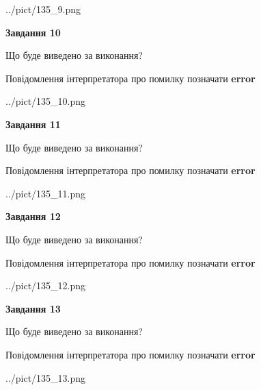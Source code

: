 \documentclass[11pt, ukrainian]{article}
\begin{document}
{\begin {large}
\begin{center}
	{../pict/135_9.png}
\end{center}
\newpage

{\begin {center}\textbf{Завдання 10}\end {center}}\par
Що буде виведено за виконання? \par
Повідомлення інтерпретатора про помилку позначати \textbf{error}

\begin{center}
	{../pict/135_10.png}
\end{center}
\newpage

{\begin {center}\textbf{Завдання 11}\end {center}}\par
Що буде виведено за виконання? \par
Повідомлення інтерпретатора про помилку позначати \textbf{error}

\begin{center}
	{../pict/135_11.png}
\end{center}
\newpage

{\begin {center}\textbf{Завдання 12}\end {center}}\par
Що буде виведено за виконання? \par
Повідомлення інтерпретатора про помилку позначати \textbf{error}

\begin{center}
	{../pict/135_12.png}
\end{center}
\newpage

{\begin {center}\textbf{Завдання 13}\end {center}}\par
Що буде виведено за виконання? \par
Повідомлення інтерпретатора про помилку позначати \textbf{error}

\begin{center}
	{../pict/135_13.png}
\end{center}
\newpage


\end{large}}
\end{document}
